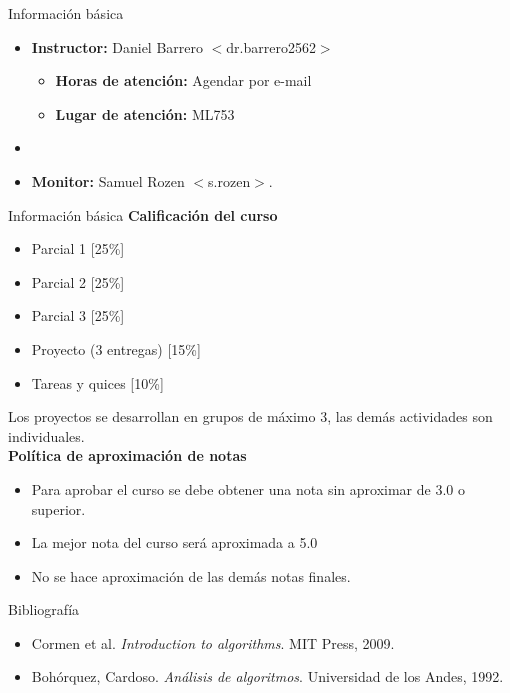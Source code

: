 

%
\frame{\titlepage}
%
\begin{frame}{Información básica}
\begin{itemize}
    \item \textbf{Instructor:} Daniel Barrero $<$dr.barrero2562$>$ 
    \begin{itemize}
        \item \textbf{Horas de atención:} Agendar por e-mail
        \item \textbf{Lugar de atención:} ML753
    \end{itemize}
    \item[ ]
    \item \textbf{Monitor:} Samuel Rozen $<$s.rozen$>$.
\end{itemize}
\end{frame}
%
\begin{frame}{Información básica}
\textbf{Calificación del curso} 
\begin{itemize}
    \item Parcial 1 [25\%]
    \item Parcial 2 [25\%]
    \item Parcial 3 [25\%] 
    \item Proyecto (3 entregas) [15\%] 
    \item Tareas y quices [10\%]
\end{itemize}
Los proyectos se desarrollan en grupos de máximo 3, las demás actividades son individuales. \\
\textbf{Política de aproximación de notas} 
\begin{itemize}
    \item Para aprobar el curso se debe obtener una nota sin aproximar de 3.0 o superior. 
    \item La mejor nota del curso será aproximada a 5.0 
    \item No se hace aproximación de las demás notas finales.
\end{itemize}
\end{frame}
%
\begin{frame}{Bibliografía}
\begin{itemize}
    \item Cormen et al. \textit{Introduction to algorithms}. MIT Press, 2009.
    \item Bohórquez, Cardoso. \textit{Análisis de algoritmos}. Universidad de los Andes, 1992.
\end{itemize}
\end{frame}
